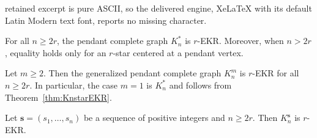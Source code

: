 \documentclass[10pt,a4paper]{amsart}
\newcommand{\s}{\mathbf{s}}
\begin{document}
retained excerpt is pure ASCII, so the delivered engine, XeLaTeX with its default Latin Modern text font, reports no missing character.
\begin{theorem}\label{thm:KnstarEKR}
For all $n \ge 2r$, the pendant complete graph $K_n^*$ is $r$-EKR. Moreover, when $n>2r$, equality holds only for an $r$-star centered at a pendant vertex.
\end{theorem}

\begin{theorem}\label{thm:PendantKn}
Let $m\ge 2$. Then the generalized pendant complete graph $K_n^m$ is $r$-EKR for all $n\ge 2r$.
In particular, the case $m=1$ is $K_n^*$ and follows from Theorem~\ref{thm:KnstarEKR}.
\end{theorem}

\begin{theorem}\label{thm:general-s}
Let $\s=(s_1,\dots,s_n)$ be a sequence of positive integers and $n\ge 2r$. Then $K_n^{\s}$ is $r$-EKR.
\end{theorem}
\end{document}
